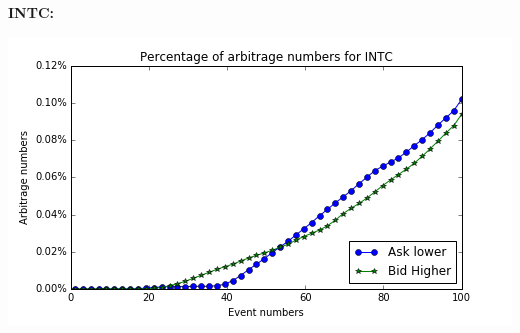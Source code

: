 \documentclass[xcolor={x11names,svgnames,dvipsnames}]{beamer}
\begin{document}
\begin{frame}
\begin{columns}
\begin{column}{.5\textwidth}
			 \textbf{INTC:}
	
										\includegraphics[width=1\textwidth, height=0.4\textheight]{INTC_arbitrage_event.png}

		\end{column}
	\end{columns}

\end{frame}
\end{document}
